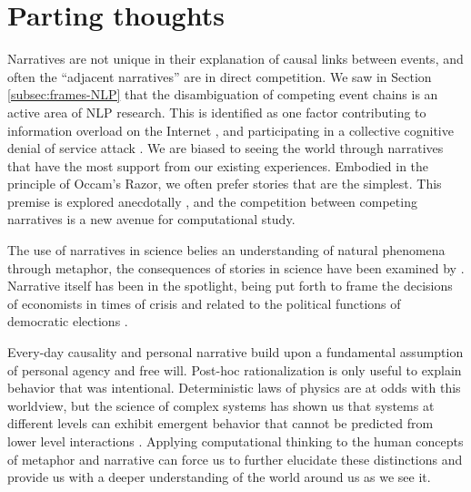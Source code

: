 \section{Parting thoughts}

Narratives are not unique in their explanation of causal links between events, and often the ``adjacent narratives'' are in direct competition.
We saw in Section \ref{subsec:frames-NLP} that the disambiguation of competing event chains is an active area of NLP research.
This is identified as one factor contributing to information overload on the Internet \citep{orman2015information}, and participating in a collective cognitive denial of service attack \citep{king2016chinese}.
We are biased to seeing the world through narratives that have the most support from our existing experiences.
Embodied in the principle of Occam's Razor, we often prefer stories that are the simplest.
This premise is explored anecdotally \citep{storr2014unpersuadables}, and the competition between competing narratives is a new avenue for computational study.

The use of narratives in science belies an understanding of natural phenomena through metaphor, the consequences of stories in science have been examined by \cite{mahoney2006tale,levy2008case,collier2011understanding,gelman2014stories}.
Narrative itself has been in the spotlight, being put forth to frame the decisions of economists in times of crisis and related to the political functions of democratic elections \citep{shriller2017narrative}.

Every-day causality and personal narrative build upon a fundamental assumption of personal agency and free will.
Post-hoc rationalization is only useful to explain behavior that was intentional.
Deterministic laws of physics are at odds with this worldview, but the science of complex systems has shown us that systems at different levels can exhibit emergent behavior that cannot be predicted from lower level interactions \citep{anderson1972a}.
Applying computational thinking to the human concepts of metaphor and narrative can force us to further elucidate these distinctions and provide us with a deeper understanding of the world around us as we see it.





